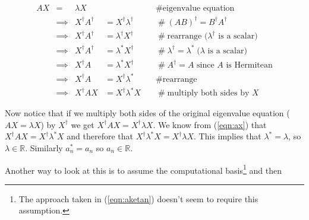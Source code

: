 \documentclass[11pt, oneside]{article}   	%
\begin{document}
\bigskip
\begin{equation}
\begin{array}{lclll}
A X
&=& \lambda X                                                                                              && \quad \mathrel{\#} \text{eigenvalue equation}  \\
&\implies& X^{\dagger} A^\dagger   &= X^{\dagger} \lambda^{\dagger}           & \quad \mathrel{\#} (AB)^\dagger = B^\dagger  A^\dagger \\
&\implies& X^{\dagger} A^\dagger   &= \lambda^{\dagger} X^{\dagger}           & \quad \mathrel{\#} \text{rearrange ($\lambda^\dagger$ is a scalar)} \\
&\implies& X^{\dagger} A^\dagger   &= \lambda^{*} X^{\dagger}                      & \quad \mathrel{\#} \lambda^\dagger = \lambda^* \; \text{($\lambda$ is a scalar)} \\
&\implies& X^{\dagger} A                 &= \lambda^{*} X^{\dagger}                      & \quad \mathrel{\#} A^\dagger = A  \text{ since $A$ is Hermitean} \\
&\implies& X^{\dagger} A                 &= X^{\dagger}   \lambda^{*}                    & \quad \mathrel{\#} \text{rearrange} \\
&\implies& X^\dagger  A X               &= X^{\dagger}  \lambda^{*} X                  & \quad \mathrel{\#} \text{multiply both sides by $X$}
\end{array}
\label{eqn:ax}
\end{equation}

\bigskip
\noindent
Now notice that if we multiply both sides of the original eigenvalue equation ($A X = \lambda X$) by $X^{\dagger}$ we get 
$X^{\dagger} AX = X^{\dagger} \lambda X$.  We know from (\ref{eqn:ax}) that $X^\dagger  A X = X^{\dagger}  \lambda^{*} X$
and therefore that $X^{\dagger}  \lambda^{*} X = X^{\dagger}  \lambda X $.
This implies that $\lambda^{*} = \lambda$, so $\lambda \in \mathbb{R}$.
Similarly $a_n^* = a_n$ so $a_n \in \mathbb{R}$.

\bigskip
\noindent
Another way to look at this is to assume the computational basis\footnote{The approach taken in (\ref{eqn:aketan}) doesn't seem to require this assumption.}
and then
\end{document}
